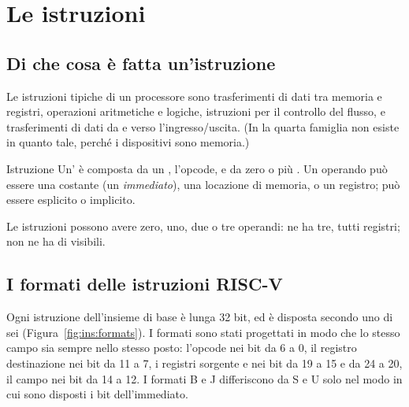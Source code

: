 \section{Le istruzioni}

\subsection{Di che cosa è fatta un'istruzione}

Le istruzioni tipiche di un processore sono trasferimenti di dati tra memoria
e registri, operazioni aritmetiche e logiche, istruzioni per il controllo del
flusso, e trasferimenti di dati da e verso l'ingresso/uscita. (In \riscv la
quarta famiglia non esiste in quanto tale, perché i dispositivi sono memoria.)

\begin{definition}{Istruzione}
Un' è composta da un , l'opcode, e da
zero o più . Un operando può essere una costante (un
\emph{immediato}), una locazione di memoria, o un registro; può essere
esplicito o implicito.
\end{definition}

Le istruzioni possono avere zero, uno, due o tre operandi:  ne ha
tre, tutti registri;  non ne ha di visibili.

\subsection{I formati delle istruzioni RISC-V}

Ogni istruzione \riscv dell'insieme di base è lunga 32 bit, ed è disposta
secondo uno di sei  (Figura~\ref{fig:ins:formats}). I formati
sono stati progettati in modo che lo stesso campo sia sempre nello stesso
posto: l'opcode nei bit da 6 a 0, il registro destinazione  nei bit
da 11 a 7, i registri sorgente  e  nei bit da 19 a 15 e da
24 a 20, il campo  nei bit da 14 a 12. I formati B e J
differiscono da S e U solo nel modo in cui sono disposti i bit dell'immediato.

